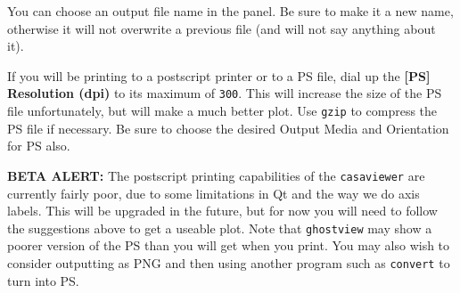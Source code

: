 You can choose an output file name in the panel.  Be sure to
make it a new name, otherwise it will not overwrite a previous file
(and will not say anything about it).

If you will be printing to a postscript printer or to a PS file,
dial up the {\bf [PS] Resolution (dpi)} to its maximum of {\tt 300}.  
This will increase the size of the PS file unfortunately, but will
make a much better plot.  Use {\tt gzip} to compress the PS file
if necessary.
Be sure to choose the desired Output Media and Orientation for
PS also.

{\bf BETA ALERT:} The postscript printing capabilities of the 
{\tt casaviewer} are currently fairly poor, due to some limitations
in Qt and the way we do axis labels.  This will be upgraded in the
future, but for now you will need to follow the suggestions above
to get a useable plot.  Note that {\tt ghostview} may show a poorer
version of the PS than you will get when you print.  You may also wish
to consider outputting as PNG and then using another program such as
{\tt convert} to turn into PS.

